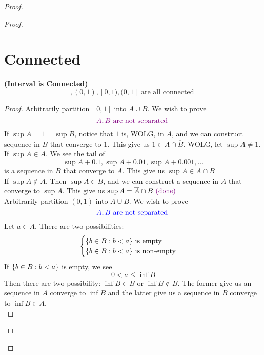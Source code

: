 \documentclass{report}
\begin{document}
\begin{proof}
\begin{proof}
\section{Connected}
\begin{theorem}
\label{3.4.1}
\textbf{(Interval is Connected)} 
\begin{equation*}
[0,1],(0,1),[0,1),(0,1]\text{ are all connected }
\end{equation*}
\end{theorem}
\begin{proof}
Arbitrarily partition $[0,1]$ into $A\cup B$. We wish to prove
\begin{equation*}
  \textcolor{violet}{A,B\text{ are not separated }}
\end{equation*}
If $\sup A=1=\sup B$, notice that $1$ is, WOLG, in $A$, and we can construct sequence in $B$ that converge to  $1$. This give us $1\in A\cap \overline{B}$. WOLG, let  $\sup A\neq 1$.\\


If $\sup A\in A$. We see the tail of
 \begin{equation*}
\sup A+0.1, \sup A+0.01, \sup A+0.001,\dots
\end{equation*}
is a sequence in $B$ that converge to  $A$. This give us $\sup A\in A\cap \overline{B}$\\

If $\sup A\not\in A$. Then $\sup A\in B$, and we can construct a sequence in $A$ that converge to  $\sup A$. This give us $\sup A=\overline{A}\cap B\textcolor{violet}{\text{ (done) }}$\\

Arbitrarily partition $(0,1)$ into $A\cup B$. We wish to prove 
\begin{equation*}
\textcolor{blue}{A,B\text{ are not separated }}
\end{equation*}
Let $a\in A$. There are two possibilities:
\begin{equation*}
\begin{cases}
  \{ b\in B: b<a \}\text{ is empty }\\
  \{ b\in B:b<a \}\text{ is non-empty }
\end{cases}
\end{equation*}
If $\{ b\in B:b<a \}$ is empty, we see
\begin{equation*}
0<a\leq \inf B
\end{equation*}
Then there are two possibility: $\inf B\in B\text{ or } \inf B\not\in B$. The former give us an sequence in $A$ converge to  $\inf B$ and the latter give us a sequence in $B$ converge to  $\inf B\in A$.\\


\end{proof}
\end{proof}
\end{proof}
\end{document}
